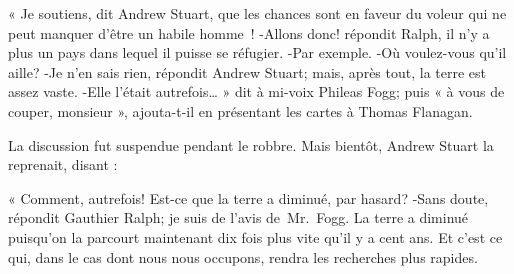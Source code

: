 \documentclass[]{book}
\begin{document}
               « Je soutiens, dit Andrew Stuart, que
               les chances sont en faveur du voleur qui
               ne peut manquer d'être un habile homme !\newline
               -Allons donc! répondit Ralph, il n'y a
               plus un pays dans lequel il puisse se réfugier.\newline
               -Par exemple. \newline
               -Où voulez-vous qu'il aille? \newline
               -Je n'en sais rien, répondit Andrew 
               Stuart; mais, après tout, la terre est assez vaste.\newline
               -Elle l'était autrefois… » dit à mi-voix 
               Phileas Fogg; puis « à vous de couper, 
               monsieur », ajouta-t-il en présentant les
               cartes à Thomas Flanagan.\newline
            
               La discussion fut suspendue pendant le
               robbre. Mais bientôt, Andrew Stuart la reprenait, disant :
            
               « Comment, autrefois! Est-ce que la 
               terre a diminué, par hasard?\newline
               -Sans doute, répondit Gauthier Ralph;
               je suis de l'avis de Mr. Fogg. La terre a
               diminué puisqu'on la parcourt maintenant 
               dix fois plus vite qu'il y a cent ans. Et
               c'est ce qui, dans le cas dont nous nous 
               occupons, rendra les recherches plus rapides.\newline 
               
\end{document}

